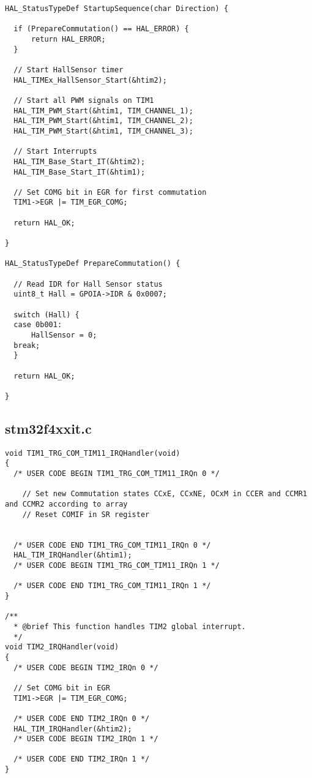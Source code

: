\begin{lstlisting}[caption={Set first commutation state according to Hall sensors},label={lst:Registers}]
HAL_StatusTypeDef StartupSequence(char Direction) {

  if (PrepareCommutation() == HAL_ERROR) {
	  return HAL_ERROR;
  }

  // Start HallSensor timer
  HAL_TIMEx_HallSensor_Start(&htim2);

  // Start all PWM signals on TIM1
  HAL_TIM_PWM_Start(&htim1, TIM_CHANNEL_1);
  HAL_TIM_PWM_Start(&htim1, TIM_CHANNEL_2);
  HAL_TIM_PWM_Start(&htim1, TIM_CHANNEL_3);

  // Start Interrupts
  HAL_TIM_Base_Start_IT(&htim2);
  HAL_TIM_Base_Start_IT(&htim1);

  // Set COMG bit in EGR for first commutation
  TIM1->EGR |= TIM_EGR_COMG;

  return HAL_OK;

}

HAL_StatusTypeDef PrepareCommutation() {

  // Read IDR for Hall Sensor status
  uint8_t Hall = GPOIA->IDR & 0x0007;

  switch (Hall) {
  case 0b001:
	  HallSensor = 0;
  break;
  }

  return HAL_OK;

}
\end{lstlisting}



\subsection{stm32f4xx\textunderscore it.c}
\begin{lstlisting}[caption={Set new Commutation states CCxE, CCxNE, OCxM in CCER and CCMR1 and CCMR2 according to array},label={lst:Registers}]
void TIM1_TRG_COM_TIM11_IRQHandler(void)
{
  /* USER CODE BEGIN TIM1_TRG_COM_TIM11_IRQn 0 */

	// Set new Commutation states CCxE, CCxNE, OCxM in CCER and CCMR1 and CCMR2 according to array
	// Reset COMIF in SR register


  /* USER CODE END TIM1_TRG_COM_TIM11_IRQn 0 */
  HAL_TIM_IRQHandler(&htim1);
  /* USER CODE BEGIN TIM1_TRG_COM_TIM11_IRQn 1 */

  /* USER CODE END TIM1_TRG_COM_TIM11_IRQn 1 */
}

/**
  * @brief This function handles TIM2 global interrupt.
  */
void TIM2_IRQHandler(void)
{
  /* USER CODE BEGIN TIM2_IRQn 0 */

  // Set COMG bit in EGR
  TIM1->EGR |= TIM_EGR_COMG;

  /* USER CODE END TIM2_IRQn 0 */
  HAL_TIM_IRQHandler(&htim2);
  /* USER CODE BEGIN TIM2_IRQn 1 */

  /* USER CODE END TIM2_IRQn 1 */
}
\end{lstlisting}
